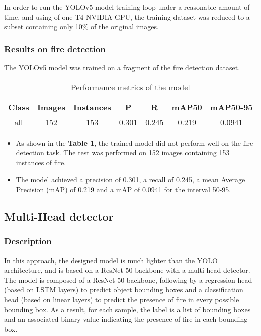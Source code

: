 \documentclass{article}
\begin{document}
In order to run the YOLOv5 model training loop under a reasonable amount of time, and using of one T4 NVIDIA GPU, the training dataset was reduced to a subset containing only 10\% of the original images.

\subsubsection{Results on fire detection}

The YOLOv5 model was trained on a fragment of the fire detection dataset.

\begin{table}[ht]
    \centering
    \begin{tabular}{|c|c|c|c|c|c|c|}
    \hline
    Class & Images & Instances & P & R & mAP50 & mAP50-95 \\ 
    \hline
    all & 152 & 153 & 0.301 & 0.245 & 0.219 & 0.0941 \\ 
    \hline
    \end{tabular}
    \caption{Performance metrics of the model}
    \label{table:first_table}
\end{table}

\begin{itemize}
    \item As shown in the \textbf{Table 1}, the trained model did not perform well on the fire detection task. The test was performed on 152 images containing 153 instances of fire.
    \item The model achieved a precision of 0.301, a recall of 0.245, a mean Average Precision (mAP) of 0.219 and a mAP of 0.0941 for the interval 50-95.
\end{itemize}

\newpage

\subsection{Multi-Head detector}

\subsubsection{Description}

In this approach, the designed model is much lighter than the YOLO architecture, and is based on a ResNet-50 backbone with a multi-head detector.
The model is composed of a ResNet-50 backbone, following by a regression head (based on LSTM layers) to predict object bounding boxes and a classification head (based on linear layers) to predict the presence of fire in every possible bounding box.
As a result, for each sample, the label is a list of bounding boxes and an associated binary value indicating the presence of fire in each bounding box.
\end{document}

